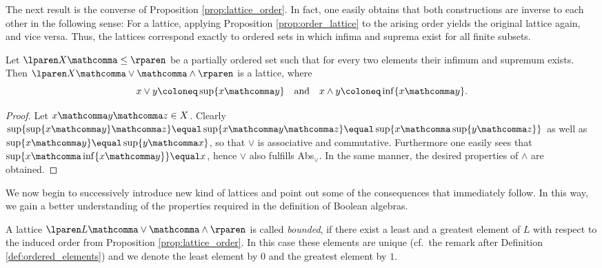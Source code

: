 The next result is the converse of Proposition \ref{prop:lattice_order}.
In fact, one easily obtains that both constructions
are inverse to each other in the following sense:
For a lattice,
applying Proposition \ref{prop:order_lattice} to the arising order
yields the original lattice again,
and vice versa.
Thus, the lattices correspond exactly
to ordered sets in which infima and suprema exist for all finite subsets.

\medskip

\begin{proposition}
\label{prop:order_lattice}
  Let
  $\lparen X \mathcomma \leq \rparen$
  be a partially ordered set
  such that for every two elements their infimum and supremum exists.
  Then
  $\lparen X \mathcomma \vee \mathcomma \wedge \rparen$
  is a lattice,
  where
  \[
    x \vee y
    \coloneq
    \sup \lbrace x \mathcomma y \rbrace
    \quad \text{and} \quad
    x \wedge y
    \coloneq
    \inf \lbrace x \mathcomma y \rbrace.
  \]
\end{proposition}

\begin{proof}
  Let $x \mathcomma y \mathcomma z \in X$.
  Clearly
  $\sup \lbrace \sup \lbrace x \mathcomma y \rbrace \mathcomma z \rbrace
  \equal \sup \lbrace x \mathcomma y \mathcomma z \rbrace
  \equal \sup \lbrace x \mathcomma \sup \lbrace y \mathcomma z \rbrace \rbrace$
  as well as
  $\sup \lbrace x \mathcomma y \rbrace
  \equal \sup \lbrace y \mathcomma x \rbrace$,
  so that $\vee$ is associative and commutative.
  Furthermore one easily sees that
  $\sup \lbrace x \mathcomma \inf \lbrace x \mathcomma y \rbrace \rbrace
  \equal x$,
  hence $\vee$ also fulfills Abs$_{\vee}$.
  In the same manner, the desired properties of $\wedge$ are obtained.
\end{proof}

\medskip

We now begin to successively introduce new kind of lattices
and point out some of the consequences that immediately follow.
In this way, we gain a better understanding
of the properties required in the definition of Boolean algebras.

\medskip

\begin{definition}
  A lattice
  $\lparen L \mathcomma \vee \mathcomma \wedge \rparen$
  is called \emph{bounded},
  if there exist a least and a greatest element of $L$
  with respect to the induced order from Proposition \ref{prop:lattice_order}.
  In this case these elements are unique
  (cf.\ the remark after Definition \ref{def:ordered_elements})
  and we denote the least element by $0$
  and the greatest element by $1$.
\end{definition}

